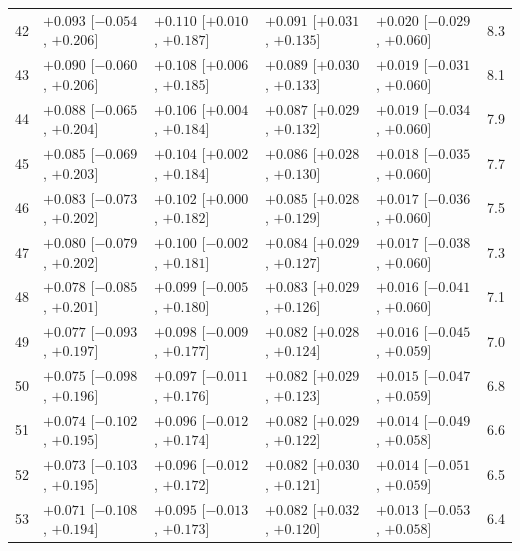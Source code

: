 \begin{longtable}{rllllr}
42 & $+0.093$ {\scriptsize [$-0.054$, $+0.206$]} & $+0.110$ {\scriptsize [$+0.010$, $+0.187$]} & $+0.091$ {\scriptsize [$+0.031$, $+0.135$]} & $+0.020$ {\scriptsize [$-0.029$, $+0.060$]} & 8.3 \\
43 & $+0.090$ {\scriptsize [$-0.060$, $+0.206$]} & $+0.108$ {\scriptsize [$+0.006$, $+0.185$]} & $+0.089$ {\scriptsize [$+0.030$, $+0.133$]} & $+0.019$ {\scriptsize [$-0.031$, $+0.060$]} & 8.1 \\
44 & $+0.088$ {\scriptsize [$-0.065$, $+0.204$]} & $+0.106$ {\scriptsize [$+0.004$, $+0.184$]} & $+0.087$ {\scriptsize [$+0.029$, $+0.132$]} & $+0.019$ {\scriptsize [$-0.034$, $+0.060$]} & 7.9 \\
45 & $+0.085$ {\scriptsize [$-0.069$, $+0.203$]} & $+0.104$ {\scriptsize [$+0.002$, $+0.184$]} & $+0.086$ {\scriptsize [$+0.028$, $+0.130$]} & $+0.018$ {\scriptsize [$-0.035$, $+0.060$]} & 7.7 \\
46 & $+0.083$ {\scriptsize [$-0.073$, $+0.202$]} & $+0.102$ {\scriptsize [$+0.000$, $+0.182$]} & $+0.085$ {\scriptsize [$+0.028$, $+0.129$]} & $+0.017$ {\scriptsize [$-0.036$, $+0.060$]} & 7.5 \\
47 & $+0.080$ {\scriptsize [$-0.079$, $+0.202$]} & $+0.100$ {\scriptsize [$-0.002$, $+0.181$]} & $+0.084$ {\scriptsize [$+0.029$, $+0.127$]} & $+0.017$ {\scriptsize [$-0.038$, $+0.060$]} & 7.3 \\
48 & $+0.078$ {\scriptsize [$-0.085$, $+0.201$]} & $+0.099$ {\scriptsize [$-0.005$, $+0.180$]} & $+0.083$ {\scriptsize [$+0.029$, $+0.126$]} & $+0.016$ {\scriptsize [$-0.041$, $+0.060$]} & 7.1 \\
49 & $+0.077$ {\scriptsize [$-0.093$, $+0.197$]} & $+0.098$ {\scriptsize [$-0.009$, $+0.177$]} & $+0.082$ {\scriptsize [$+0.028$, $+0.124$]} & $+0.016$ {\scriptsize [$-0.045$, $+0.059$]} & 7.0 \\
50 & $+0.075$ {\scriptsize [$-0.098$, $+0.196$]} & $+0.097$ {\scriptsize [$-0.011$, $+0.176$]} & $+0.082$ {\scriptsize [$+0.029$, $+0.123$]} & $+0.015$ {\scriptsize [$-0.047$, $+0.059$]} & 6.8 \\
51 & $+0.074$ {\scriptsize [$-0.102$, $+0.195$]} & $+0.096$ {\scriptsize [$-0.012$, $+0.174$]} & $+0.082$ {\scriptsize [$+0.029$, $+0.122$]} & $+0.014$ {\scriptsize [$-0.049$, $+0.058$]} & 6.6 \\
52 & $+0.073$ {\scriptsize [$-0.103$, $+0.195$]} & $+0.096$ {\scriptsize [$-0.012$, $+0.172$]} & $+0.082$ {\scriptsize [$+0.030$, $+0.121$]} & $+0.014$ {\scriptsize [$-0.051$, $+0.059$]} & 6.5 \\
53 & $+0.071$ {\scriptsize [$-0.108$, $+0.194$]} & $+0.095$ {\scriptsize [$-0.013$, $+0.173$]} & $+0.082$ {\scriptsize [$+0.032$, $+0.120$]} & $+0.013$ {\scriptsize [$-0.053$, $+0.058$]} & 6.4 \\

\end{longtable}
